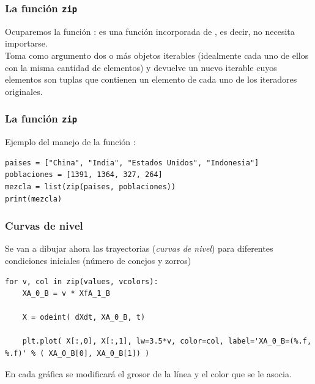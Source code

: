 \begin{frame}[fragile]
\frametitle{La función \texttt{zip}}
Ocuparemos la función : es una función incorporada de \python, es decir, no necesita importarse.
\\
\bigskip
Toma como argumento dos o más objetos iterables (idealmente cada uno de ellos con la misma cantidad de elementos) y devuelve un nuevo iterable cuyos elementos son tuplas que contienen un elemento de cada uno de los iteradores originales.
\end{frame}
\begin{frame}[fragile]
\frametitle{La función \texttt{zip}}
Ejemplo del manejo de la función :
\begin{lstlisting}[caption=Ejemplo de la función zip, style=codigopython]
paises = ["China", "India", "Estados Unidos", "Indonesia"]
poblaciones = [1391, 1364, 327, 264]
mezcla = list(zip(paises, poblaciones))
print(mezcla)
\end{lstlisting}
\fontsize{12}{12}
\end{frame}
\begin{frame}
\frametitle{Curvas de nivel}
Se van a dibujar ahora las trayectorias (\emph{curvas de nivel}) para diferentes condiciones iniciales (número de conejos y zorros)
\begin{lstlisting}[caption=Graficando las curvas de nivel, style=codigopython]
for v, col in zip(values, vcolors):
    XA_0_B = v * XfA_1_B
    
    X = odeint( dXdt, XA_0_B, t)

    plt.plot( X[:,0], X[:,1], lw=3.5*v, color=col, label='XA_0_B=(%.f, %.f)' % ( XA_0_B[0], XA_0_B[1]) )
\end{lstlisting}
En cada gráfica se modificará el grosor de la línea y el color que se le asocia.
\end{frame}
